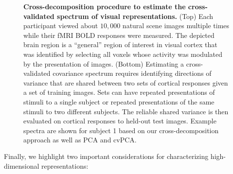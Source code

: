 \documentclass[10pt]{article}
\begin{document}
\begin{figure}


\caption{\label{fig-schematic}\textbf{Cross-decomposition procedure to
estimate the cross-validated spectrum of visual representations.} (Top)
Each participant viewed about \(10,000\) natural scene images multiple
times while their fMRI BOLD responses were measured. The depicted brain
region is a ``general'' region of interest in visual cortex that was
identified by selecting all voxels whose activity was modulated by the
presentation of images. (Bottom) Estimating a cross-validated covariance
spectrum requires identifying directions of variance that are shared
between two sets of cortical responses given a set of training images.
Sets can have repeated presentations of stimuli to a single subject or
repeated presentations of the same stimuli to two different subjects.
The reliable shared variance is then evaluated on cortical responses to
held-out test images. Example spectra are shown for subject 1 based on
our cross-decomposition approach as well as PCA and cvPCA.}

\end{figure}%

Finally, we highlight two important considerations for characterizing
high-dimensional representations:
\end{document}
